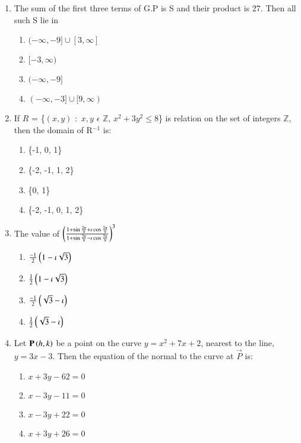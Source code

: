 \documentclass[journal]{IEEEtran}
\begin{document}
\begin{enumerate}
\item The sum of the first three terms of G.P is S and their product is 27. Then all such S lie in
\begin{multicols}{2}
    \begin{enumerate}
        \item $(-\infty, -9] \cup [3,\infty]$
        \item $[-3,\infty)$
        \item $(-\infty,-9]$
        \item $(-\infty,-3] \cup [9,\infty)$
    \end{enumerate}
\end{multicols}

\item If $R$ = \{$(x,y)$ $\colon$ $x,y$ $\epsilon$ $\mathbb{Z}$, $x^2+3y^2 \leq 8$\} is relation on the set of integers $\mathbb{Z}$, then the domain of R$^{-1}$ is:
\begin{multicols}{2}
    \begin{enumerate}
        \item \{-1, 0, 1\}
        \item \{-2, -1, 1, 2\}
        \item \{0, 1\}
        \item \{-2, -1, 0, 1, 2\}
    \end{enumerate}
\end{multicols}

\item The value of $\left(\frac{1+\sin{\frac{2\pi}{9}} + \iota \cos{\frac{2\pi}{9}}}{{1+\sin{\frac{2\pi}{9}} - \iota \cos{\frac{2\pi}{9}}}}\right)^3$
\begin{multicols}{2}
    \begin{enumerate}
        \item $\frac{-1}{2}\left(1-\iota\sqrt{3}\right)$
        \item $\frac{1}{2}\left(1-\iota\sqrt{3}\right)$
        \item $\frac{-1}{2}\left(\sqrt{3}-\iota\right)$
        \item $\frac{1}{2}\left(\sqrt{3}-\iota\right)$
    \end{enumerate}
\end{multicols}

\item Let $\mathbf{P}\left(h,k\right)$ be a point on the curve $y=x^2+7x+2$, nearest to the line, $y=3x-3$. Then the equation of the normal to the curve at $\vec{P}$ is:
\begin{multicols}{2}
    \begin{enumerate}
        \item $x+3y-62=0$
        \item $x-3y-11=0$
        \item $x-3y+22=0$
        \item $x+3y+26=0$
    \end{enumerate}
\end{multicols}


\end{enumerate}
\end{document}
